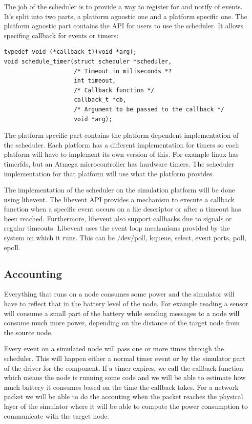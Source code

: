 The job of the scheduler is to provide a way to register for and notify of
events. It's split into two parts, a platform agnostic one and a platform
specific one. The platform agnostic part contains the API for users to use the
scheduler. It allows specifing callback for events or timers:

\begin{lstlisting}
typedef void (*callback_t)(void *arg);
void schedule_timer(struct scheduler *scheduler,
                    /* Timeout in miliseconds *?
                    int timeout, 
                    /* Callback function */
                    callback_t *cb, 
                    /* Argument to be passed to the callback */
                    void *arg);
\end{lstlisting}
The platform specific part contains the platform dependent implementation of
the scheduler. Each platform has a different implementation for timers so each
platform will have to implement its own version of this. For example linux has
timerfds, but an Atmega microcontroller has hardware timers. The scheduler
implementation for that platform will use what the platform provides.

The implementation of the scheduler on the simulation platform will be done
using libevent. The libevent API provides a mechanism to execute a callback
function when a specific event occurs on a file descriptor or after a timeout
has been reached. Furthermore, libevent also support callbacks due to signals
or regular timeouts. Libevent uses the event loop mechanisms provided by the
system on which it runs. This can be /dev/poll, kqueue, select, event ports,
poll, epoll.

\subsection{Accounting}

Everything that runs on a node consumes some power and the simulator will have
to reflect that in the battery level of the node. For example reading a sensor
will consume a small part of the battery while sending messages to a node will
consume much more power, depending on the distance of the target node from the
source node.

Every event on a simulated node will pass one or more times through the
scheduler. This will happen either a normal timer event or by the simulator
part of the driver for the component. If a timer expires, we call the callback
function which means the node is running some code and we will be able to
estimate how much battery it consumes based on the time the callback takes.
For a network packet we will be able to do the accouting when the packet
reaches the physical layer of the simulator where it will be able to compute
the power consumption to communicate with the target node.
